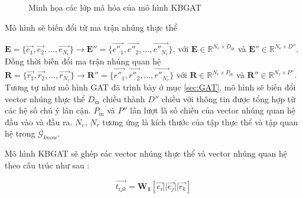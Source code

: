 \begin{figure}[htp]
{
	}
	\caption{Minh họa các lớp mã hóa của mô hình KBGAT}
	\label{fig:encoderKBGAT}
\end{figure}

Mô hình sẽ biến đổi từ ma trận nhúng thực thể

$\mathbf{E} = \Big\{\overrightarrow{e_1}, \overrightarrow{e_2}, ...,  \overrightarrow{e_{N_e}}\Big\} \xrightarrow{} \mathbf{E''} = \Big\{\overrightarrow{e''_1}, \overrightarrow{e''_2}, ...,  \overrightarrow{e''_{N_e}}\Big\}$, với $\mathbf{E} \in \mathbb{R}^{N_e \times D_{\text{in}}}$ và $\mathbf{E''} \in \mathbb{R}^{N_e \times D''}$.
Đồng thời biến đổi ma trận nhúng quan hệ 
$\mathbf{R} = \Big\{\overrightarrow{r_1}, \overrightarrow{r_2}, ...,  \overrightarrow{r_{N_r}}\Big\} \xrightarrow{} \mathbf{R''} = \Big\{\overrightarrow{r''_1}, \overrightarrow{r''_2}, ...,  \overrightarrow{r''_{N_r}}\Big\}$ với $\mathbf{R} \in \mathbb{R}^{N_r \times P_{\text{in}}}$ và $\mathbf{R''} \in \mathbb{R}^{N_r \times P''}$. Tương tự như mô hình GAT đã trình bày ở mục \ref{sec:GAT}, mô hình sẽ biến đổi vector nhúng thực thể $D_{\text{in}}$ chiều thành $D''$ chiều với thông tin được tổng hợp từ các hệ số chú ý lân cận. $P_{\text{in}}$ và $P''$ lần lượt là số chiều của vector nhúng quan hệ đầu vào và đầu ra. $N_e$, $N_r$ tương ứng là kích thước của tập thực thể và tập quan hệ trong $\mathcal{G}_{know}$.

Mô hình KBGAT sẽ ghép các vector nhúng thực thể và vector nhúng quan hệ theo cấu trúc như sau :

\begin{equation}
	\label{attentionWithRelation}
	\overrightarrow{t_{ijk}} = \mathbf{W_1} [\overrightarrow{e_i} || \overrightarrow{e_j} || \overrightarrow{r_k}]
\end{equation}

